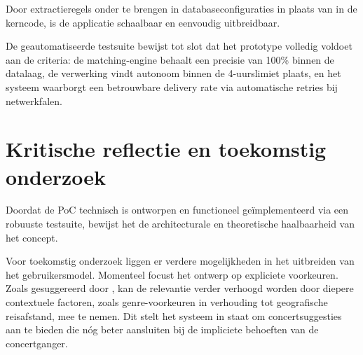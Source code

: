 Door extractieregels onder te brengen in databaseconfiguraties in plaats van in de kerncode, 
is de applicatie schaalbaar en eenvoudig uitbreidbaar. 

De geautomatiseerde testsuite bewijst tot slot 
dat het prototype volledig voldoet aan de criteria: 
de matching-engine behaalt een precisie van 100\% 
binnen de datalaag, de verwerking vindt autonoom 
binnen de 4-uurslimiet plaats, en het systeem 
waarborgt een betrouwbare delivery rate via 
automatische retries bij netwerkfalen.

\section*{Kritische reflectie en toekomstig onderzoek}

Doordat de \gls{PoC} technisch is ontworpen en 
functioneel geïmplementeerd via een robuuste 
testsuite, bewijst het de architecturale en 
theoretische haalbaarheid van het concept. 

Voor toekomstig onderzoek liggen er verdere 
mogelijkheden in het uitbreiden van het gebruikersmodel. 
Momenteel focust het ontwerp op expliciete voorkeuren. 
Zoals gesuggereerd door \textcite{Zangerle2018}, kan 
de relevantie verder verhoogd worden door diepere 
contextuele factoren, zoals genre-voorkeuren in 
verhouding tot geografische reisafstand, mee te nemen. 
Dit stelt het systeem in staat om concertsuggesties 
aan te bieden die nóg beter aansluiten bij de 
impliciete behoeften van de concertganger.


